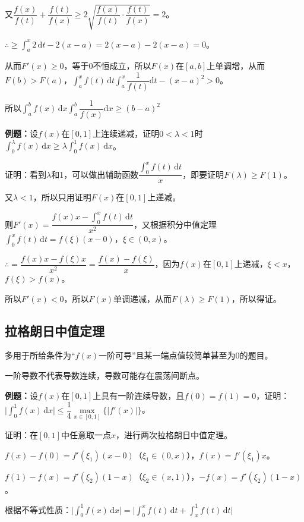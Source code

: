 \documentclass[UTF8, 12pt]{ctexart}
\begin{document}
又$\dfrac{f(x)}{f(t)}+\dfrac{f(t)}{f(x)}\geqslant2\sqrt{\dfrac{f(x)}{f(t)}\cdot\dfrac{f(t)}{f(x)}}=2$。

$\therefore\geqslant\int_a^x2\,\textrm{d}t-2(x-a)=2(x-a)-2(x-a)=0$。

从而$F'(x)\geqslant0$，等于0不恒成立，所以$F(x)$在$[a,b]$上单调增，从而$F(b)>F(a)$，$\displaystyle{\int_a^xf(t)\,\textrm{d}t\int_a^x\dfrac{1}{f(t)}\textrm{d}t-(x-a)^2}>0$。

所以$\displaystyle{\int_a^bf(x)\,\textrm{d}x\int_a^b\dfrac{1}{f(x)}\textrm{d}x}\geqslant(b-a)^2$

\textbf{例题：}设$f(x)$在$[0,1]$上连续递减，证明$0<\lambda<1$时$\int_0^\lambda f(x)\,\textrm{d}x\geqslant\lambda\int_0^1f(x)\,\textrm{d}x$。

证明：看到$\lambda$和1，可以做出辅助函数$\dfrac{\int_0^xf(t)\,\textrm{d}t}{x}$，即要证明$F(\lambda)\geqslant F(1)$。

又$\lambda<1$，所以只用证明$F(x)$在$[0,1]$上递减。

则$F'(x)=\dfrac{f(x)x-\int_0^xf(t)\,\textrm{d}t}{x^2}$，又根据积分中值定理$\int_0^xf(t)\,\textrm{d}t=f(\xi)(x-0)$，$\xi\in(0,x)$。

$\therefore=\dfrac{f(x)x-f(\xi)x}{x^2}=\dfrac{f(x)-f(\xi)}{x}$，因为$f(x)$在$[0,1]$上递减，$\xi<x$，$f(\xi)>f(x)$。

所以$F'(x)<0$，所以$F(x)$单调递减，从而$F(\lambda)\geqslant F(1)$，所以得证。

\subsection{拉格朗日中值定理}

多用于所给条件为“$f(x)$一阶可导”且某一端点值较简单甚至为0的题目。

一阶导数不代表导数连续，导数可能存在震荡间断点。

\textbf{例题：}设$f(x)$在$[0,1]$上具有一阶连续导数，且$f(0)=f(1)=0$，证明：$\vert\int_0^1f(x)\,\textrm{d}x\vert\leqslant\dfrac{1}{4}\max\limits_{x\in[0,1]}\{\vert f'(x)\vert\}$。

证明：在$[0,1]$中任意取一点$x$，进行两次拉格朗日中值定理。

$f(x)-f(0)=f'(\xi_1)(x-0)$（$\xi_1\in(0,x)$），$f(x)=f'(\xi_1)x$。

$f(1)-f(x)=f'(\xi_2)(1-x)$（$\xi_2\in(x,1)$），$-f(x)=f'(\xi_2)(1-x)$。

根据不等式性质：$\vert\int_0^1f(x)\,\textrm{d}x\vert=\vert\int_0^xf(t)\,\textrm{d}t+\int_x^1f(t)\,\textrm{d}t\vert$
\end{document}
